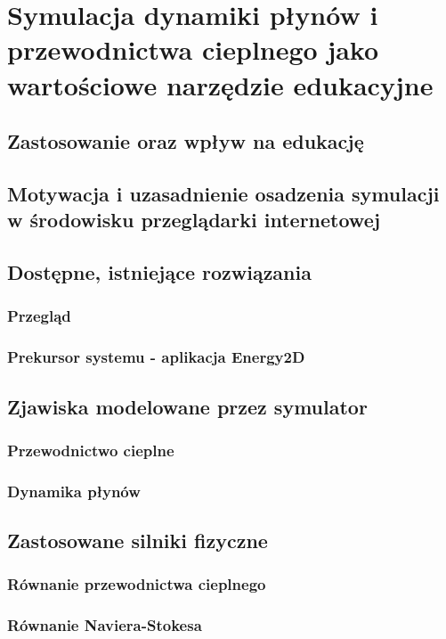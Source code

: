 \chapter{Symulacja dynamiki płynów i przewodnictwa cieplnego jako wartościowe narzędzie edukacyjne}
\section{Zastosowanie oraz wpływ na edukację}
\section{Motywacja i uzasadnienie osadzenia symulacji w środowisku przeglądarki internetowej}
\section{Dostępne, istniejące rozwiązania}
\subsection{Przegląd}
\subsection{Prekursor systemu - aplikacja Energy2D}
\section{Zjawiska modelowane przez symulator}
\subsection{Przewodnictwo cieplne}
\subsection{Dynamika płynów}
\section{Zastosowane silniki fizyczne}
\label{sec:silnikiFizyczne}
\subsection{Równanie przewodnictwa cieplnego}
\subsection{Równanie Naviera-Stokesa}